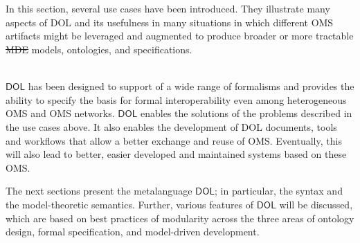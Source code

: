\documentclass[10pt, a4paper]{isov2}
\newcommand{\bc}[1]{~\\{\color{violet}\large \hrulefill \href{http://issues.omg.org/browse/DOL-#1}{\normalfont{JIRA DOL-{}#1}} \hrulefill\\}  }
\newcommand{\ec}[0]{~\\{{\color{violet}\large \hrulefill {\normalfont{end}} \hrulefill\\}  }}
\newcommand*{\DOL}{\ensuremath{\mathsf{DOL}}\xspace}
\providecommand{\DIFdeltex}[1]{{\protect\color{red}\sout{#1}}}                      %
\providecommand{\DIFdelbegin}{} %
\providecommand{\DIFdelend}{} %
\providecommand{\DIFdel}[1]{\texorpdfstring{\DIFdeltex{#1}}{}} %
\begin{document}


\bc{82}
In this section, several use cases have been introduced. They illustrate many aspects of DOL and its usefulness in many situations in which different OMS artifacts might be leveraged and augmented to produce broader or more tractable \DIFdelbegin \DIFdel{MDE }\DIFdelend models, ontologies, and specifications.
\ec

 \DOL has been designed to support of a wide range of formalisms and
provides the ability to specify the basis for formal interoperability even among heterogeneous OMS and OMS networks. \DOL enables the solutions of the problems described in the use cases above. It also enables the development of DOL documents, tools and workflows that 
allow  a better exchange and reuse of OMS. Eventually, this will also lead to better, easier developed and maintained systems based on these OMS.

The next sections present the metalanguage \DOL{}; in particular, the syntax and the model-theoretic semantics. Further, various features of \DOL will be discussed, which  are based on  best practices of modularity  across
 the three areas of ontology design, formal 
specification, and model-driven development.


\end{document}
